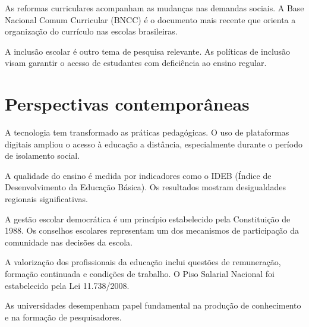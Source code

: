 \documentclass[a4paper, 12pt]{report}
\begin{document}
\newpage

As reformas curriculares acompanham as mudanças nas demandas sociais. A Base
Nacional Comum Curricular (BNCC) é o documento mais
recente que orienta a organização do currículo nas escolas
brasileiras.

A inclusão escolar é outro tema de pesquisa relevante. As
políticas de inclusão visam garantir o acesso de estudantes com
deficiência ao ensino regular.

\chapter{Perspectivas contemporâneas}

A tecnologia tem transformado as práticas pedagógicas.
O uso de plataformas digitais ampliou o acesso à
educação a distância, especialmente durante o período
de isolamento social.

A qualidade do ensino é medida por indicadores como o
IDEB (Índice de Desenvolvimento da Educação
Básica). Os resultados mostram desigualdades
regionais significativas.

A gestão escolar democrática é um princípio estabelecido pela
Constituição de 1988. Os conselhos
escolares representam um dos mecanismos de participação da
comunidade nas decisões da escola.

A valorização dos profissionais da educação inclui
questões de remuneração, formação continuada e condições de trabalho. O Piso Salarial Nacional foi estabelecido pela Lei 11.738/2008.

As universidades desempenham papel fundamental na produção de
conhecimento e na formação de pesquisadores.


\imprimirindice
\end{document}
